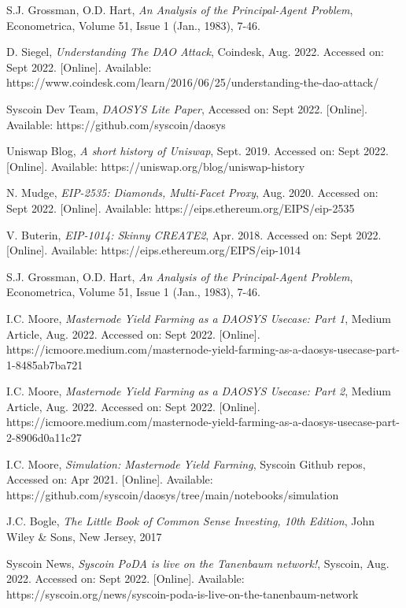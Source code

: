 \documentclass[journal,twocolumn,12pt]{ieeesyscoin}
\begin{document}
\begin{thebibliography}{00}

 S.J. Grossman, O.D. Hart, \textit{An Analysis of the Principal-Agent Problem}, Econometrica, Volume 51, Issue 1 (Jan., 1983), 7-46.

 D. Siegel, \textit{Understanding The DAO Attack}, Coindesk, Aug. 2022. Accessed on: Sept 2022. [Online]. Available: https://www.coindesk.com/learn/2016/06/25/understanding-the-dao-attack/

 Syscoin Dev Team, \textit{DAOSYS Lite Paper}, Accessed on: Sept 2022.  [Online]. Available:  https://github.com/syscoin/daosys

 Uniswap Blog, \textit{A short history of Uniswap}, Sept. 2019. Accessed on: Sept 2022.  [Online]. Available:  https://uniswap.org/blog/uniswap-history

 N. Mudge, \textit{EIP-2535: Diamonds, Multi-Facet Proxy}, Aug. 2020. Accessed on: Sept 2022.  [Online]. Available: https://eips.ethereum.org/EIPS/eip-2535

 V. Buterin, \textit{EIP-1014: Skinny CREATE2}, Apr. 2018. Accessed on: Sept 2022.  [Online]. Available: https://eips.ethereum.org/EIPS/eip-1014

 S.J. Grossman, O.D. Hart, \textit{An Analysis of the Principal-Agent Problem}, Econometrica, Volume 51, Issue 1 (Jan., 1983), 7-46.

 I.C. Moore,  \textit{Masternode Yield Farming as a DAOSYS Usecase: Part 1}, Medium Article, Aug. 2022. Accessed on: Sept 2022.  [Online]. https://icmoore.medium.com/masternode-yield-farming-as-a-daosys-usecase-part-1-8485ab7ba721

 I.C. Moore,  \textit{Masternode Yield Farming as a DAOSYS Usecase: Part 2}, Medium Article, Aug. 2022. Accessed on: Sept 2022.  [Online]. https://icmoore.medium.com/masternode-yield-farming-as-a-daosys-usecase-part-2-8906d0a11c27

 I.C. Moore, \textit{Simulation: Masternode Yield Farming}, Syscoin Github repos, Accessed on: Apr 2021.  [Online]. Available: https://github.com/syscoin/daosys/tree/main/notebooks/simulation

 J.C. Bogle, \textit{The Little Book of Common Sense Investing, 10th Edition}, John Wiley \& Sons, New Jersey, 2017

 Syscoin News, \textit{Syscoin PoDA is live on the Tanenbaum network!}, Syscoin, Aug. 2022. Accessed on: Sept 2022.  [Online]. Available: https://syscoin.org/news/syscoin-poda-is-live-on-the-tanenbaum-network


\end{thebibliography}
\end{document}
